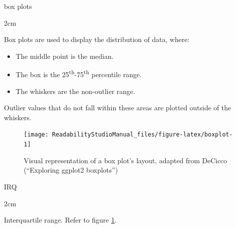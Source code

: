 \documentclass[
]{book}
\providecommand{\tightlist}{%
  \setlength{\itemsep}{0pt}\setlength{\parskip}{0pt}}
\newenvironment{glsentry}
  {
  \begin{minipage}{\textwidth}
  }
  {
  \end{minipage}
  }
\newenvironment{glsterm}
  {
  \bfseries
  }
  {
  }
\newenvironment{glsdef}
  {
  \noindent
  \flushleft
  \begin{adjustwidth}{2cm}{}
  }
  {
  \end{adjustwidth}
  }
\theoremstyle{definition}
\theoremstyle{definition}
\theoremstyle{definition}
\theoremstyle{definition}
\theoremstyle{remark}
\begin{document}
\begin{glsterm}
box plots

\end{glsterm}

\begin{glsdef}

Box plots are used to display the distribution of data, where:

\begin{itemize}
\tightlist
\item
  The middle point is the median.
\item
  The box is the 25\textsuperscript{th}-75\textsuperscript{th} percentile range.
\item
  The whiskers are the non-outlier range.
\end{itemize}

Outlier values that do not fall within these areas are plotted outside of the whiskers.

\begin{figure}[H]

{\centering \texttt{[image: ReadabilityStudioManual\_files/figure-latex/boxplot-1]} 

}

\caption{Visual representation of a box plot's layout, adapted from DeCicco (“Exploring ggplot2 boxplots”)}\label{fig:boxplot}
\end{figure}

\end{glsdef}

\begin{glsentry}

\begin{glsterm}
IRQ

\end{glsterm}

\begin{glsdef}
Interquartile range. Refer to figure \ref{fig:boxplot}.

\end{glsdef}

\end{glsentry}
\end{document}
